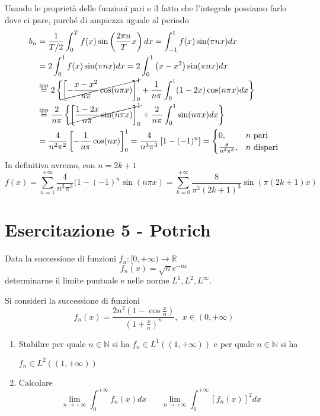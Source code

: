 Usando le proprietà delle funzioni pari e il fatto che l'integrale possiamo farlo dove ci pare, purché di ampiezza uguale al periodo
\begin{equation*}
\begin{aligned}
b_{n} & =\frac{1}{T/2}\int ^{T}_{0} f(x)\sin\left(\frac{2\pi n}{T} x\right) dx=\int ^{1}_{-1} f(x)\sin( \pi nx) dx\\
 & =2\int ^{1}_{0} f(x)\sin( \pi nx) dx=2\int ^{1}_{0}\left( x-x^{2}\right)\sin( \pi nx) dx\\
 & \overset{\text{ipp}}{=} 2\left\{\cancel{\left[ -\frac{x-x^{2}}{n\pi }\cos( n\pi x)\right]^{1}_{0}} +\frac{1}{n\pi }\int ^{1}_{0}( 1-2x)\cos( n\pi x) dx\right\}\\
 & \overset{\text{ipp}}{=}\frac{2}{n\pi }\left\{\cancel{\left[\frac{1-2x}{n\pi }\sin( n\pi x)\right]^{1}_{0}} +\frac{2}{n\pi }\int ^{1}_{0}\sin( n\pi x) dx\right\}\\
 & =\frac{4}{n^{2} \pi ^{2}}\left[ -\frac{1}{n\pi }\cos (nx)\right]^{1}_{0} =\frac{4}{n^{3} \pi ^{3}}\left[ 1-( -1)^{n}\right] =\begin{cases}
0, & n\ \text{pari}\\
\frac{8}{n^{3} \pi ^{3}} , & n\ \text{dispari}
\end{cases}
\end{aligned}
\end{equation*}
In definitiva avremo, con $n=2k+1$
\begin{equation*}
f(x)=\sum ^{+\infty }_{n=1}\frac{4}{n^{3} \pi ^{3}} (1-( -1)^{n}\sin (n\pi x)=\sum ^{+\infty }_{k=0}\frac{8}{\pi ^{3} (2k+1)^{3}}\sin (\pi (2k+1)x)
\end{equation*}
\chapter{Esercitazione 5 - Potrich}
\ParteEsercizi
\Esercizio{}

Data la successione di funzioni $f_{n} :[ 0,+\infty )\rightarrow \mathbb{R}$
\begin{equation*}
f_{n}( x) =\sqrt{n} e^{-nx}
\end{equation*}
determinarne il limite puntuale e nelle norme $L^{1} ,L^{2} ,L^{\infty }$.
\Esercizio{}

Si consideri la successione di funzioni
\begin{equation*}
f_{n} (x)=\frac{2n^{2}\left( 1-\cos\frac{x}{n}\right)}{\left( 1+\frac{x}{n}\right)^{n}} ,\ \ x\in (0,+\infty )
\end{equation*}
\begin{enumerate}
\item Stabilire per quale $n\in \mathbb{N}$ si ha $f_{n} \in L^{1}(( 1,+\infty ))$ e per quale $n\in \mathbb{N}$ si ha 

$f_{n} \in L^{2}(( 1,+\infty ))$
\item Calcolare\begin{equation*}
\lim\limits _{n\rightarrow +\infty }\int ^{+\infty }_{0} f_{n}( x) dx\ \ \ \ \ \ \ \ \lim\limits _{n\rightarrow +\infty }\int ^{+\infty }_{0}[ f_{n}( x)]^{2} dx
\end{equation*}
\end{enumerate}
\Esercizio{}

